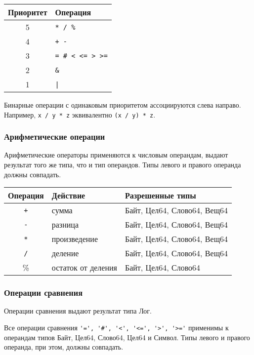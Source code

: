 \begin{tabular}[c]{c|l}
\textbf{Приоритет} & \textbf{Операция} \\ 
\hline
5 &   \verb#* / %# \\
4 &   \verb#+ -# \\
3 &   \verb|= # < <= > >=| \\
2 &   \verb#&# \\
1 &  \verb#|# \\
\hline
\end{tabular}

\bigskip
Бинарные операции с одинаковым приоритетом ассоциируются слева направо. Например, \verb|x / y * z| эквивалентно \verb|(x / y) * z|.

\hypertarget{ops-arithmetic}{%
\subsubsection{Арифметические операции}\label{expr:ops-arithmetic}}

Арифметические операторы применяются к числовым операндам, выдают результат того же типа, что и тип операндов.
Типы левого и правого операнда должны совпадать. 

\bigskip
\begin{tabular}[c]{c|l|l}
\textbf{Операция} & \textbf{Действие} & \textbf{Разрешенные типы} \\ 
\hline
\verb|+| & сумма & Байт, Цел64, Слово64, Вещ64 \\
\verb|-| &  разница & Байт, Цел64, Слово64, Вещ64 \\
\verb|*| & произведение & Байт, Цел64, Слово64, Вещ64 \\
\verb|/| &  деление & Байт, Цел64, Слово64, Вещ64\\
\% & остаток от деления  &  Байт, Цел64, Слово64 \\
\hline
\end{tabular}


\hypertarget{ops-comparison}{%
\subsubsection{Операции сравнения}\label{expr:ops-comparison}}

Операции сравнения выдают результат типа Лог. 

Все операции сравнения \verb|'=', '#', '<', '<=', '>', '>='| применимы к операндам типов Байт, Цел64, Слово64, Цел64 и Символ. 
Типы левого и правого операнда, при этом, должны совпадать.


